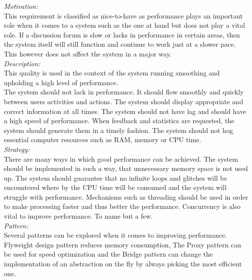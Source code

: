\documentclass[a4paper,12pt]{report}
\begin{document}
		\emph{Motivation: }\\ This requirement is classified as nice-to-have  as performance plays an important role when it comes to a system such as the one at hand but does not play a vital role. If a discussion forum is slow or lacks in performance in certain areas, then the system itself will still function and continue to work just at a slower pace. This however does not affect the system in a major way.	\\
		
		\emph{Description: }\\This quality is used in the context of the system running smoothing and upholding a high level of performance. \\
		The system should not lack in performance. It should flow smoothly and quickly between users activities and actions. The system should display appropriate and correct information at all times. The system should not have lag and should have a high speed of performance. When feedback and statistics are requested, the system should generate them in a timely fashion. The system should not hog essential computer resources such as RAM, memory or CPU time.\\
		
		\emph{Strategy: }\\ There are many ways in which good performance can be achieved. The system should be implemented in such a way, that unnecessary memory space is not used up. The system should guarantee that no infinite loops and glitches will be encountered where by the CPU time will be consumed and the system will struggle with performance. Mechanisms such as threading should be used in order to make processing faster and thus better the performance. Concurrency is also vital to improve performance. To name but a few. \\
		
		\emph{Pattern: }\\ Several patterns can be explored when it comes to improving performance. Flyweight design pattern reduces memory consumption, The Proxy pattern can be used for speed optimization and the Bridge pattern can change the implementation of an abstraction on the fly by always picking the most efficient one.\\
		
\end{document}
